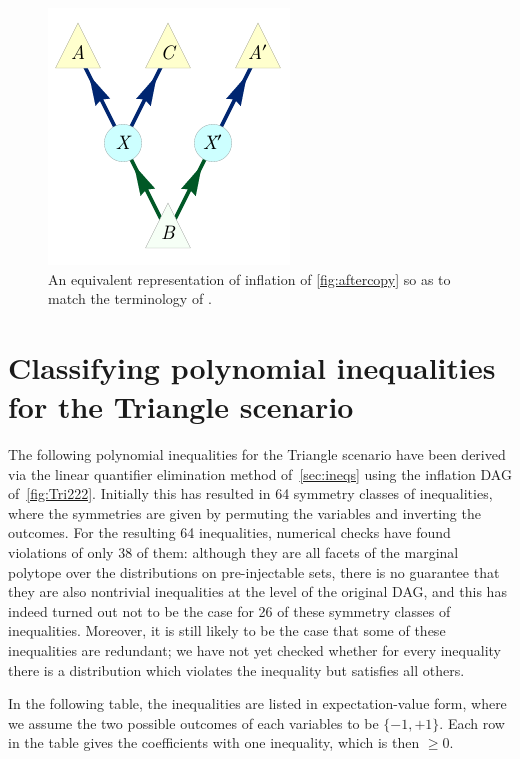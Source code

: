\begin{figure}[H]
\begin{minipage}[t]{0.3\linewidth}
\end{minipage}
\hfill
\begin{minipage}[t]{0.3\linewidth}
\centering
\includegraphics[scale=1]{shannonYEScopyKacedV1.pdf}
\caption{An equivalent representation of inflation of \cref{fig:aftercopy} so as to match the terminology of \citet{kaced_equivalence_2013}.}
\end{minipage}
\end{figure}

\section{Classifying polynomial inequalities for the Triangle scenario}
\label{sec:38ineqs}

The following polynomial inequalities for the Triangle scenario have been derived via the linear quantifier elimination method of~\cref{sec:ineqs} using the inflation DAG of~\cref{fig:Tri222}. Initially this has resulted in 64 symmetry classes of inequalities, where the symmetries are given by permuting the variables and inverting the outcomes. For the resulting 64 inequalities, numerical checks have found violations of only 38 of them: although they are all facets of the marginal polytope over the distributions on pre-injectable sets, there is no guarantee that they are also nontrivial inequalities at the level of the original DAG, and this has indeed turned out not to be the case for 26 of these symmetry classes of inequalities. Moreover, it is still likely to be the case that some of these inequalities are redundant; we have not yet checked whether for every inequality there is a distribution which violates the inequality but satisfies all others.

In the following table, the inequalities are listed in expectation-value form, where we assume the two possible outcomes of each variables to be $\{-1,+1\}$. Each row in the table gives the coefficients with one inequality, which is then $\geq 0$.

